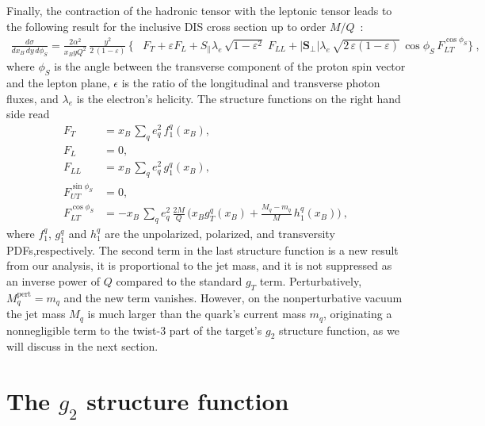 \documentclass[preprintnumbers,floatfix,nofootinbib]{revtex4}
\newcommand{\xbj}{{x_B}}                   %
\newcommand{\mj}{M_q}
\newcommand{\mq}{m_q}
\begin{document}
Finally, the contraction of the hadronic tensor with the leptonic tensor leads
to the following result for the inclusive DIS cross section up to order $M/Q$~\cite{Bacchetta:2006tn}:
\begin{align}
\frac{d\sigma}{d\xbj \, dy\, d\phi_S}
=
\frac{2 \alpha^2}{\xbj y Q^2}\,
\frac{y^2}{2\,(1-\varepsilon)}\, 
\biggl\{
&F_{T} + \varepsilon F_{L}
+ S_\parallel \lambda_e\,
  \sqrt{1-\varepsilon^2}\; 
F_{LL}
+ |\bm{S}_\perp| \lambda_e\, \sqrt{2\,\varepsilon (1-\varepsilon)}\, 
  \cos\phi_S\, 
F_{LT}^{\cos \phi_S}
 \biggr\} \ ,
\label{e:crossdis}
\end{align}
where $\phi_S$ is the angle between the transverse component of the proton spin vector and the lepton plane, $\epsilon$ is the ratio of the longitudinal and transverse photon fluxes, and $\lambda_e$ is the electron's helicity. 
The structure functions on the right hand side read
\begin{align}
F_{T} &= \xbj\,\sum_q e_q^2\,f_1^q(\xbj),
\\
F_{L} &= 0,
\\
F_{LL} &=\xbj\,\sum_q e_q^2\,g_1^q(\xbj),
\label{e:FLLint}
\\
F_{UT}^{\sin \phi_S}&=0,
\label{e:FUTint}
\\
F_{LT}^{\cos \phi_S}&=-\xbj\,\sum_q e_q^2\, \frac{2M}{Q}\,
\biggl(\xbj  g_T^q(\xbj)
   + \frac{\mj -\mq}{M} \, h_{1}^q(\xbj) \biggr) \ ,
\label{e:FLTint}
\end{align}
where $f_1^q$, $g_1^q$ and $h_1^q$ are the unpolarized, polarized, and transversity PDFs,respectively.
The second term in the last structure function is a new result from our
analysis, it is proportional to the jet mass, and it is not suppressed as an
inverse power of $Q$ compared to the 
standard $g_T$ term. Perturbatively, $M_q^\text{pert}=m_q$ and the new term vanishes. However, on the nonperturbative vacuum the jet mass $M_q$ is much larger than the quark's current mass $m_q$, originating a nonnegligible term to the twist-3 part of the target's $g_2$ structure function, as we will discuss in the next section.  

 

\section{The $g_2$ structure function}
\label{sec:g2}
\end{document}
